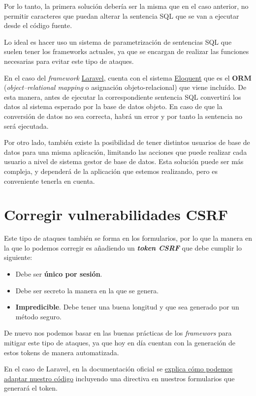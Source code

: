 \documentclass{\ClassPath/viu-tfm-template}
\begin{document}
Por lo tanto, la primera solución debería ser la misma que en el caso anterior, no permitir caracteres que puedan alterar la sentencia SQL que se van a ejecutar desde el código fuente.

Lo ideal es hacer uso un sistema de parametrización de sentencias SQL que suelen tener los frameworks actuales, ya que se encargan de realizar las funciones necesarias para evitar este tipo de ataques.

En el caso del \textit{framework} \href{https://laravel.com/}{Laravel}, cuenta con el sistema \href{https://laravel.com/docs/6.x/eloquent}{Eloquent} que es el \textbf{ORM} (\textit{object–relational mapping} o asignación objeto-relacional) que viene incluído. De esta manera, antes de ejecutar la correspondiente sentencia SQL convertirá los datos al sistema esperado por la base de datos objeto. En caso de que la conversión de datos no sea correcta, habrá un error y por tanto la sentencia no será ejecutada.


Por otro lado, también existe la posibilidad de tener distintos usuarios de base de datos para una misma aplicación, limitando las acciones que puede realizar cada usuario a nivel de sistema gestor de base de datos. Esta solución puede ser más compleja, y dependerá de la aplicación que estemos realizando, pero es conveniente tenerla en cuenta.


\section{Corregir vulnerabilidades CSRF}
Este tipo de ataques también se forma en los formularios, por lo que la manera en la que lo podemos corregir es añadiendo un \textit{\textbf{token CSRF}} que debe cumplir lo siguiente:

\begin{itemize}
    \item Debe ser \textbf{único por sesión}.
    \item Debe ser secreto la manera en la que se genera.
    \item \textbf{Impredicible}. Debe tener una buena longitud y que sea generado por un método seguro.
\end{itemize}

De nuevo nos podemos basar en las buenas prácticas de los \textit{framewors} para mitigar este tipo de ataques, ya que hoy en día cuentan con la generación de estos tokens de manera automatizada.

En el caso de Laravel, en la documentación oficial se \href{https://laravel.com/docs/6.x/csrf}{explica cómo podemos adaptar nuestro código} incluyendo una directiva en nuestros formularios que generará el token.
\end{document}
